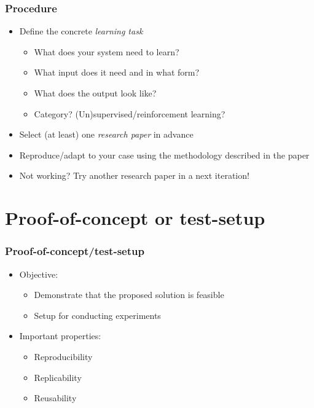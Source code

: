 \documentclass[aspectratio=169]{beamer}
\begin{document}
\begin{frame}[plain]
  \frametitle{Procedure}

  \begin{itemize}
    \item Define the concrete \textit{learning task}
    \begin{itemize}
      \item What does your system need to learn?
      \item What input does it need and in what form?
      \item What does the output look like?
      \item Category? (Un)supervised/reinforcement learning?
    \end{itemize}
    \item Select (at least) one \textit{research paper} in advance
    \item Reproduce/adapt to your case using the methodology described in the paper
    \item Not working? Try another research paper in a next iteration!
  \end{itemize}

\end{frame}

\section{Proof-of-concept or test-setup}

\begin{frame}
  \frametitle{Proof-of-concept/test-setup}

  \begin{itemize}
    \item Objective:
          \begin{itemize}
            \item Demonstrate that the proposed solution is feasible
            \item Setup for conducting experiments
          \end{itemize}
    \item Important properties:
          \begin{itemize}
            \item Reproducibility
            \item Replicability
            \item Reusability
          \end{itemize}
  \end{itemize}

\end{frame}
\end{document}
